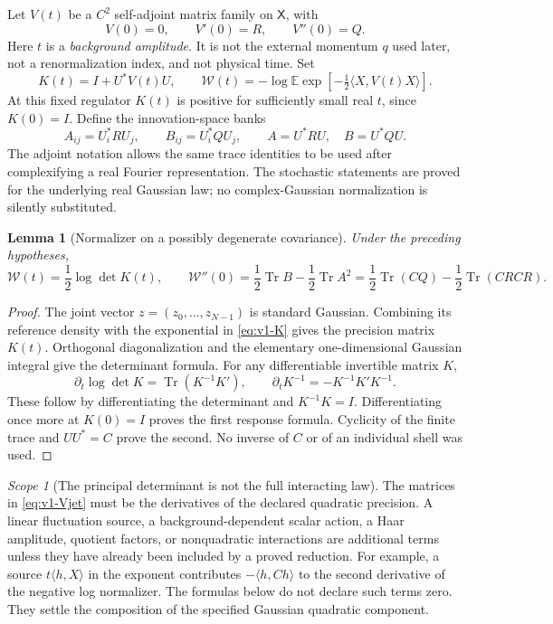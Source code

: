 \documentclass[11pt,a4paper]{article}
\newtheorem{lemma}[lemma]{Lemma}
\theoremstyle{definition}
\theoremstyle{remark}
\newtheorem{scope}[scope]{Scope}
\DeclareMathOperator{\Tr}{Tr}
\newcommand{\E}{\mathbb E}
\newcommand{\ip}[2]{\langle #1,#2\rangle}
\begin{document}
Let $V(t)$ be a $C^2$ self-adjoint matrix family on $\mathsf X$, with
\begin{equation}\label{eq:v1-Vjet}
             V(0)=0,\qquad V'(0)=R,\qquad V''(0)=Q.
\end{equation}
Here $t$ is a \emph{background amplitude}. It is not the external momentum
$q$ used later, not a renormalization index, and not physical time. Set
\begin{equation}\label{eq:v1-K}
 K(t)=I+U^*V(t)U,
 \qquad
 \mathcal W(t)=-\log\E\exp\left[-\tfrac12\ip{X}{V(t)X}\right].
\end{equation}
At this fixed regulator $K(t)$ is positive for sufficiently small real
$t$, since $K(0)=I$. Define the innovation-space banks
\begin{equation}\label{eq:v1-banks}
 A_{ij}=U_i^*RU_j,\qquad B_{ij}=U_i^*QU_j,
 \qquad A=U^*RU,\quad B=U^*QU.
\end{equation}
The adjoint notation allows the same trace identities to be used after
complexifying a real Fourier representation. The stochastic statements
are proved for the underlying real Gaussian law; no complex-Gaussian
normalization is silently substituted.

\begin{lemma}[Normalizer on a possibly degenerate covariance]
\label{lem:v1-normalizer}
Under the preceding hypotheses,
\begin{equation}\label{eq:v1-normalizer}
 \mathcal W(t)=\frac12\log\det K(t),\qquad
 \mathcal W''(0)=\frac12\Tr B-\frac12\Tr A^2
               =\frac12\Tr(CQ)-\frac12\Tr(CRCR).
\end{equation}
\end{lemma}
\begin{proof}
The joint vector $z=(z_0,\ldots,z_{N-1})$ is standard Gaussian. Combining
its reference density with the exponential in \cref{eq:v1-K} gives the
precision matrix $K(t)$. Orthogonal diagonalization and the elementary
one-dimensional Gaussian integral give the determinant formula.
For any differentiable invertible matrix $K$,
\[
 \partial_t\log\det K=\Tr(K^{-1}K'),\qquad
 \partial_t K^{-1}=-K^{-1}K'K^{-1}.
\]
These follow by differentiating the determinant and $K^{-1}K=I$.
Differentiating once more at $K(0)=I$ proves the first response formula.
Cyclicity of the finite trace and $UU^*=C$ prove the second. No inverse
of $C$ or of an individual shell was used.
\end{proof}

\begin{scope}[The principal determinant is not the full interacting law]
The matrices in \cref{eq:v1-Vjet} must be the derivatives of the declared
quadratic precision. A linear fluctuation source, a background-dependent
scalar action, a Haar amplitude, quotient factors, or nonquadratic
interactions are additional terms unless they have already been included
by a proved reduction. For example, a source $t\ip{h}{X}$ in the
exponent contributes $-\ip{h}{Ch}$ to the second derivative of the
negative log normalizer. The formulas below do not declare such terms
zero. They settle the composition of the specified Gaussian quadratic
component.
\end{scope}
\end{document}
